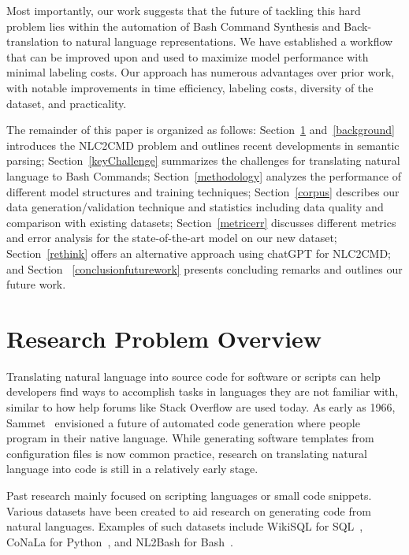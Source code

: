\documentclass{river-journal}
\begin{document}
Most importantly, our work suggests that the future of tackling this hard problem lies within the automation of Bash Command Synthesis and Back-translation to natural language representations. We have established a workflow that can be improved upon and used to maximize model performance with minimal labeling costs. Our approach has numerous advantages over prior work, with notable improvements in time efficiency, labeling costs, diversity of the dataset, and practicality.

The remainder of this paper is organized as follows: Section~\ref{overview} and~\ref{background} introduces the NLC2CMD problem and outlines recent developments in semantic parsing; Section~\ref{keyChallenge} summarizes the challenges for translating natural language to Bash Commands; Section~\ref{methodology} analyzes the performance of different model structures and training techniques; Section~\ref{corpus} describes our data generation/validation technique and statistics including data quality and comparison with existing datasets; Section~\ref{metricerr} discusses different metrics and error analysis for the state-of-the-art model on our new dataset; Section~\ref{rethink} offers an alternative approach using chatGPT for NLC2CMD; and Section ~\ref{conclusionfuturework} presents concluding remarks and outlines our future work.

\section{Research Problem Overview}
\label{overview}

Translating natural language into source code for software or scripts can help developers find ways to accomplish tasks in languages they are not familiar with, similar to how help forums like Stack Overflow are used today. As early as 1966, Sammet~\cite{Sammet1966TheUO} envisioned a future of automated code generation where people program in their native language. While generating software templates from configuration files is now common practice, research on translating natural language into code is still in a relatively early stage. 

Past research mainly focused on scripting languages or small code snippets. Various datasets have been created to aid research on generating code from natural languages. Examples of such datasets include WikiSQL for SQL~\cite{zhongSeq2SQL2017}, CoNaLa for Python~\cite{yin2018mining}, and NL2Bash for Bash~\cite{Lin2018NL2BashAC}.
\end{document}
